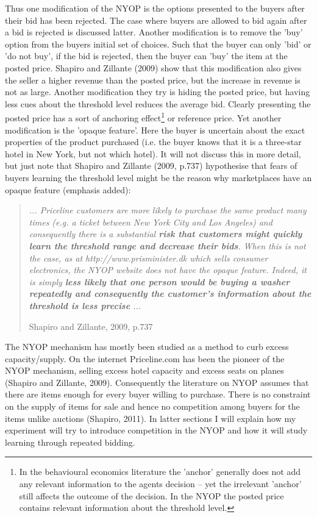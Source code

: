 \documentclass[a4paper,12pt]{article}
\begin{document}
	Thus one modification of the NYOP is the options presented to the buyers after their bid has been rejected. The case where buyers are allowed to bid again after a bid is rejected is discussed latter. Another modification is to remove the 'buy' option from the buyers initial set of choices. Such that the buyer can only 'bid' or 'do not buy', if the bid is rejected, then the buyer can 'buy' the item at the posted price. Shapiro and Zillante (2009) show that this modification also gives the seller a higher revenue than the posted price, but the increase in revenue is not as large. Another modification they try is hiding the posted price, but having less cues about the threshold level reduces the average bid. Clearly presenting the posted price has a sort of anchoring effect\footnote{In the behavioural economics literature the 'anchor' generally does not add any relevant information to the agents decision -- yet the irrelevant 'anchor' still affects the outcome of the decision. In the NYOP the posted price contains relevant information about the threshold level.} or reference price. Yet another modification is the 'opaque feature'. Here the buyer is uncertain about the exact properties of the product purchased (i.e. the buyer knows that it is a three-star hotel in New York, but not which hotel). It will not discuss this in more detail, but just note that Shapiro and Zillante (2009, p.737) hypothesise that fears of buyers learning the threshold level might be the reason why marketplaces have an opaque feature (emphasis added):
	\blockquote[Shapiro and Zillante, 2009, p.737]{\emph{ ... Priceline customers are more likely to purchase the same product many times (e.g. a ticket between New York City and Los Angeles) and consequently there is a substantial {\bf risk that customers might quickly learn the threshold range and decrease their bids}. When this is not the case, as at http://www.prisminister.dk which sells consumer electronics, the NYOP website does not have the opaque feature. Indeed, it is simply {\bf less likely that one person would be buying a washer repeatedly and consequently the customer's information about the threshold is less precise} ...}}

	The NYOP mechanism has mostly been studied as a method to curb excess capacity/supply. On the internet Priceline.com has been the pioneer of the NYOP mechanism, selling excess hotel capacity and excess seats on planes (Shapiro and Zillante, 2009). Consequently the literature on NYOP assumes that there are items enough for every buyer willing to purchase. There is no constraint on the supply of items for sale and hence no competition among buyers for the items unlike auctions (Shapiro, 2011). In latter sections I will explain how my experiment will try to introduce competition in the NYOP and how it will study learning through repeated bidding.
\end{document}
